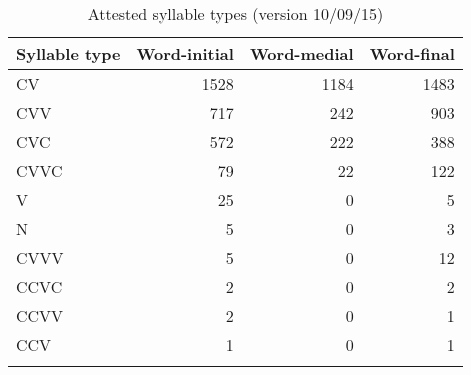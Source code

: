\begin{table} 
 
\caption[Syllable Types]{Attested syllable types (version 10/09/15)
\label{tab:syll-type}}
\begin{tabular}{lrrr}
\lsptoprule
Syllable type & Word-initial & Word-medial & Word-final \\[1ex]
\midrule
CV & 1528 & 1184 & 1483  \\ 
CVV & 717 & 242 & 903  \\ 
CVC & 572 & 222& 388  \\
CVVC & 79 & 22 & 122  \\ 
V & 25 & 0 & 5 \\ 
N & 5 & 0 & 3  \\ 
CVVV & 5&0&12 \\
CCVC & 2 & 0 & 2  \\
CCVV & 2 & 0 & 1 \\ 
CCV & 1 & 0 & 1 \\ 


 \lspbottomrule
\end{tabular}
\end{table} 



